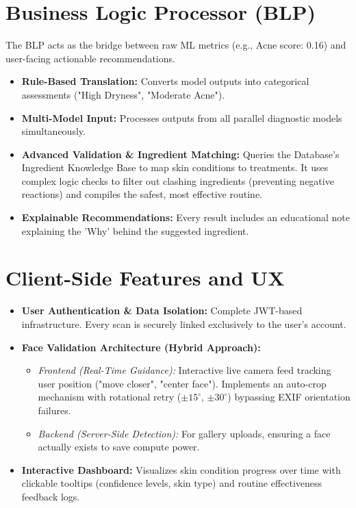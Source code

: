 \documentclass[12pt,a4paper]{article}
\begin{document}
\section{Business Logic Processor (BLP)}
The BLP acts as the bridge between raw ML metrics (e.g., Acne score: 0.16) and user-facing actionable recommendations.
\begin{itemize}
    \item \textbf{Rule-Based Translation:} Converts model outputs into categorical assessments ("High Dryness", "Moderate Acne").
    \item \textbf{Multi-Model Input:} Processes outputs from all parallel diagnostic models simultaneously.
    \item \textbf{Advanced Validation \& Ingredient Matching:} Queries the Database's Ingredient Knowledge Base to map skin conditions to treatments. It uses complex logic checks to filter out clashing ingredients (preventing negative reactions) and compiles the safest, most effective routine.
    \item \textbf{Explainable Recommendations:} Every result includes an educational note explaining the 'Why' behind the suggested ingredient.
\end{itemize}

\section{Client-Side Features and UX}
\begin{itemize}
    \item \textbf{User Authentication \& Data Isolation:} Complete JWT-based infrastructure. Every scan is securely linked exclusively to the user's account.
    \item \textbf{Face Validation Architecture (Hybrid Approach):}
    \begin{itemize}
        \item \textit{Frontend (Real-Time Guidance):} Interactive live camera feed tracking user position ("move closer", "center face"). Implements an auto-crop mechanism with rotational retry ($\pm15^{\circ}$, $\pm30^{\circ}$) bypassing EXIF orientation failures.
        \item \textit{Backend (Server-Side Detection):} For gallery uploads, ensuring a face actually exists to save compute power.
    \end{itemize}
    \item \textbf{Interactive Dashboard:} Visualizes skin condition progress over time with clickable tooltips (confidence levels, skin type) and routine effectiveness feedback logs.
\end{itemize}
\end{document}
